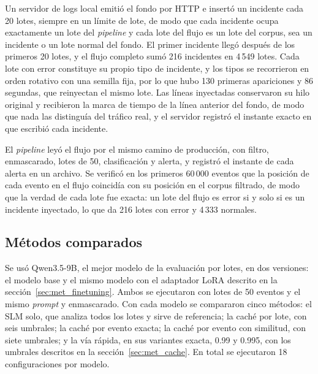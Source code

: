 Un servidor de logs local emitió el fondo por HTTP e insertó un incidente cada 20 lotes, siempre en un límite de lote, de modo que cada incidente ocupa exactamente un lote del \textit{pipeline} y cada lote del flujo es un lote del corpus, sea un incidente o un lote normal del fondo. El primer incidente llegó después de los primeros 20 lotes, y el flujo completo sumó 216 incidentes en 4\,549 lotes. Cada lote con error constituye su propio tipo de incidente, y los tipos se recorrieron en orden rotativo con una semilla fija, por lo que hubo 130 primeras apariciones y 86 segundas, que reinyectan el mismo lote. Las líneas inyectadas conservaron su hilo original y recibieron la marca de tiempo de la línea anterior del fondo, de modo que nada las distinguía del tráfico real, y el servidor registró el instante exacto en que escribió cada incidente.

El \textit{pipeline} leyó el flujo por el mismo camino de producción, con filtro, enmascarado, lotes de 50, clasificación y alerta, y registró el instante de cada alerta en un archivo. Se verificó en los primeros 60\,000 eventos que la posición de cada evento en el flujo coincidía con su posición en el corpus filtrado, de modo que la verdad de cada lote fue exacta: un lote del flujo es error si y solo si es un incidente inyectado, lo que da 216 lotes con error y 4\,333 normales.

\subsection{Métodos comparados}

Se usó Qwen3.5-9B, el mejor modelo de la evaluación por lotes, en dos versiones: el modelo base y el mismo modelo con el adaptador LoRA descrito en la sección~\ref{sec:met_finetuning}. Ambos se ejecutaron con lotes de 50 eventos y el mismo \textit{prompt} y enmascarado. Con cada modelo se compararon cinco métodos: el SLM solo, que analiza todos los lotes y sirve de referencia; la caché por lote, con seis umbrales; la caché por evento exacta; la caché por evento con similitud, con siete umbrales; y la vía rápida, en sus variantes exacta, 0.99 y 0.995, con los umbrales descritos en la sección~\ref{sec:met_cache}. En total se ejecutaron 18 configuraciones por modelo.

